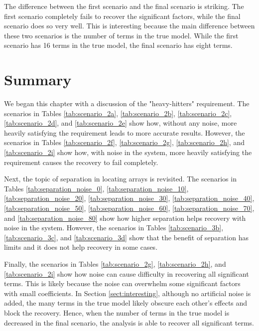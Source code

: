 The difference between the first scenario and the final scenario is striking.
The first scenario completely fails to recover the significant factors, while the final scenario does so very well.
This is interesting because the main difference between these two scenarios is the number of terms in the true model.
While the first scenario has 16 terms in the true model, the final scenario has eight terms.

\section{Summary}

We began this chapter with a discussion of the "heavy-hitters" requirement.
The scenarios in Tables \ref{tab:scenario_2a}, \ref{tab:scenario_2b}, \ref{tab:scenario_2c}, \ref{tab:scenario_2d}, and \ref{tab:scenario_2e} show how, without any noise, more heavily satisfying the requirement leads to more accurate results.
However, the scenarios in Tables \ref{tab:scenario_2f}, \ref{tab:scenario_2g}, \ref{tab:scenario_2h}, and \ref{tab:scenario_2i} show how, with noise in the system, more heavily satisfying the requirement causes the recovery to fail completely.

Next, the topic of separation in locating arrays is revisited.
The scenarios in Tables \ref{tab:separation_noise_0}, \ref{tab:separation_noise_10}, \ref{tab:separation_noise_20}, \ref{tab:separation_noise_30}, \ref{tab:separation_noise_40}, \ref{tab:separation_noise_50}, \ref{tab:separation_noise_60}, \ref{tab:separation_noise_70}, and \ref{tab:separation_noise_80} show how higher separation helps recovery with noise in the system.
However, the scenarios in Tables \ref{tab:scenario_3b}, \ref{tab:scenario_3c}, and \ref{tab:scenario_3d} show that the benefit of separation has limits and it does not help recovery in some cases.

Finally, the scenarios in Tables \ref{tab:scenario_2g}, \ref{tab:scenario_2h}, and \ref{tab:scenario_2i} show how noise can cause difficulty in recovering all significant terms.
This is likely because the noise can overwhelm some significant factors with small coefficients.
In Section \ref{sect:interesting}, although no artificial noise is added, the many terms in the true model likely obscure each other's effects and block the recovery.
Hence, when the number of terms in the true model is decreased in the final scenario, the analysis is able to recover all significant terms.
